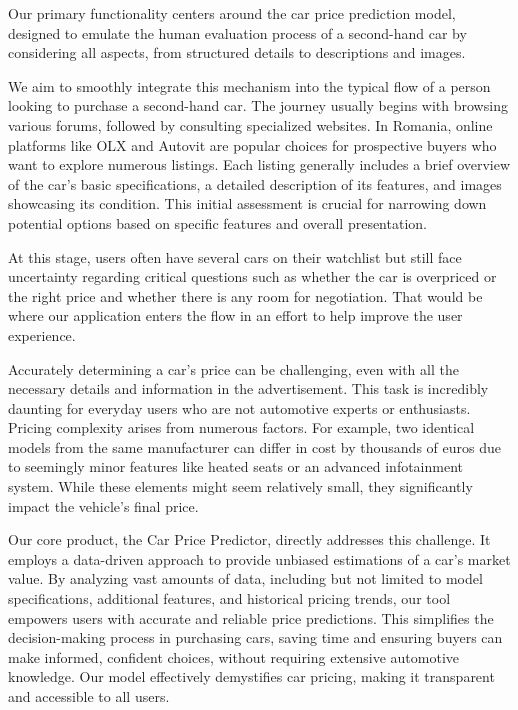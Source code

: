 Our primary functionality centers around the car price prediction model, designed to emulate the human evaluation process of a second-hand car by considering all aspects, from structured details to descriptions and images.

We aim to smoothly integrate this mechanism into the typical flow of a person looking to purchase a second-hand car. The journey usually begins with browsing various forums, followed by consulting specialized websites. In Romania, online platforms like OLX \cite{OLX} and Autovit \cite{Autovit} are popular choices for prospective buyers who want to explore numerous listings. Each listing generally includes a brief overview of the car's basic specifications, a detailed description of its features, and images showcasing its condition. This initial assessment is crucial for narrowing down potential options based on specific features and overall presentation.

At this stage, users often have several cars on their watchlist but still face uncertainty regarding critical questions such as whether the car is overpriced or the right price and whether there is any room for negotiation. That would be where our application enters the flow in an effort to help improve the user experience.

Accurately determining a car's price can be challenging, even with all the necessary details and information in the advertisement. This task is incredibly daunting for everyday users who are not automotive experts or enthusiasts. Pricing complexity arises from numerous factors. For example, two identical models from the same manufacturer can differ in cost by thousands of euros due to seemingly minor features like heated seats or an advanced infotainment system. While these elements might seem relatively small, they significantly impact the vehicle's final price.

Our core product, the Car Price Predictor, directly addresses this challenge. It employs a data-driven approach to provide unbiased estimations of a car's market value. By analyzing vast amounts of data, including but not limited to model specifications, additional features, and historical pricing trends, our tool empowers users with accurate and reliable price predictions. This simplifies the decision-making process in purchasing cars, saving time and ensuring buyers can make informed, confident choices, without requiring extensive automotive knowledge. Our model effectively demystifies car pricing, making it transparent and accessible to all users.

